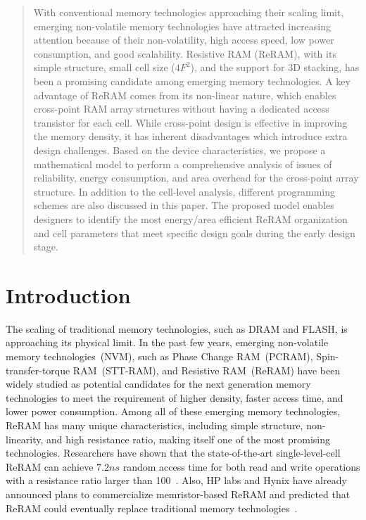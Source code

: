 \begin{abstract}
With conventional memory technologies approaching their scaling limit,
emerging non-volatile memory technologies have attracted increasing%
attention because of their non-volatility, high access speed, low power
consumption, and good scalability. Resistive RAM (ReRAM), with its simple
structure, small cell size ($4F^2$), and the support for 3D stacking, has been
a promising candidate among emerging memory technologies.
A key advantage of ReRAM
comes from its non-linear nature, which enables  cross-point
RAM array structures without having a dedicated access transistor for each cell. While
cross-point design is effective in improving the memory density, it has
inherent disadvantages which introduce extra design challenges. Based on
the device characteristics, we propose a
mathematical model to perform a comprehensive analysis of issues of
reliability, energy consumption, and area overhead for the cross-point array structure. In addition to the
cell-level analysis, different programming schemes are also discussed in
this paper. The proposed model enables designers to identify the most
energy/area efficient ReRAM organization and cell parameters that meet
specific design goals during the early design stage.
\end{abstract}

\section{Introduction}\label{sec:intro}
The scaling of traditional memory technologies, such as DRAM and FLASH, is
approaching its physical limit. In the past few years, emerging
non-volatile memory technologies~(NVM), such as Phase Change RAM~(PCRAM),
Spin-transfer-torque RAM~(STT-RAM), and Resistive RAM~(ReRAM) have been
widely studied as potential candidates for the next generation memory
technologies to meet the requirement of higher density, faster access
time, and lower power consumption. Among all of these emerging memory
technologies, ReRAM has many unique characteristics, including simple
structure, non-linearity,  and high resistance ratio, making itself one of
the most promising technologies. Researchers have shown that the
state-of-the-art single-level-cell ReRAM can achieve $7.2ns$ random access
time for both read and write operations with a resistance ratio larger
than 100~\cite{ReRAM_ISSCC2011_Sheu}. Also, HP labs and Hynix have already
announced plans to commercialize memristor-based ReRAM and predicted
that ReRAM could eventually replace traditional memory
technologies~\cite{memristor:HpHynix}.

